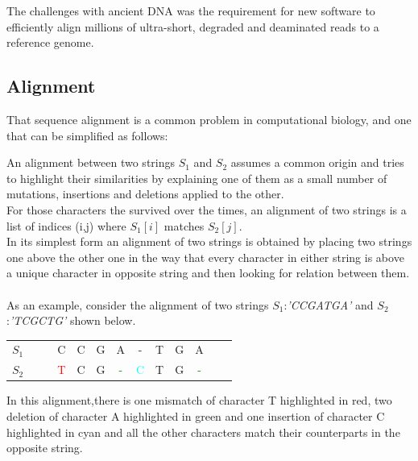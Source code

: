 \documentclass[11pt,a4paper]{report}
\begin{document}
The challenges with ancient DNA was the requirement for new software to efficiently 
align millions of ultra-short, degraded and deaminated reads to a reference genome.


\subsection{Alignment} \label{Alignment}


That sequence alignment is a common problem in computational biology, and one that can be simplified as follows:

An alignment between two strings $S_{1}$ and $S_{2}$ assumes a common origin and 
tries to highlight their similarities by explaining one of them as a small number 
of mutations, insertions and deletions applied to the other.\\

For those characters the survived over the times, an alignment of two strings is a list of indices (i,j) where $S_{1}[i]$ matches $S_{2}[j]$.\\ 
In its simplest form an alignment of two strings is obtained by placing two strings one above 
the other one in the way that every character in either string is above a unique character 
in opposite string and then looking for relation between them.\\\\

As an example, consider the alignment of two strings $S_{1}$:\emph{'CCGATGA'} and $S_{2}$:\emph{'TCGCTG'} shown below. 

\begin{center}
	\begin{tabular}{ c c c |c| c c |c|c| c c|c| c c}
   $S_{1}$   &  & & C & C & G & A & - & T & G & A && \\
$S_{2}$ 	&  & &{\textcolor{red}T}& C & G & {\textcolor{green}-}& {\textcolor{cyan}C }  &  T & G & {\textcolor{green}- }& \\
    	                                 
	\end{tabular}
\end{center} 
In this alignment,there is one mismatch of character T highlighted in red, 
two deletion of character A highlighted in green and one insertion of character
C highlighted in cyan and all the other characters match their counterparts in the opposite string. 
\\\\
\end{document}
